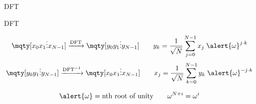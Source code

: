 
\begin{frame}{DFT}
\end{frame}


\begin{frame}{DFT}

\[
    \mqty[x_0 \\ x_1 \\ \vdots \\ x_{N-1}] 
    \xrightarrow{\text{DFT}}
    \mqty[y_0 \\ y_1 \\ \vdots \\ y_{N-1}] 
    \qquad 
    y_k = \frac{1}{\sqrt{N}} \sum_{j=0}^{N-1} x_j \; \alert{\omega}^{j \cdot k}
\]
\[
    \mqty[y_0 \\ y_1 \\ \vdots \\ y_{N-1}] 
    \xrightarrow{\text{DFT}^{-1}}
    \mqty[x_0 \\ x_1 \\ \vdots \\ x_{N-1}] 
    \qquad 
    x_j = \frac{1}{\sqrt{N}} \sum_{k=0}^{N-1} y_k \; \alert{\omega}^{-j \cdot k}
\]

\bigskip
\[ \alert{\omega} = \text{nth root of unity} \qquad \omega^{N+i}=\omega^i \]
\end{frame}


